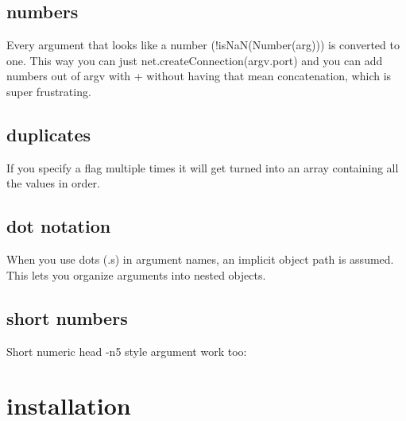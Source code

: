 \subsection*{numbers }

Every argument that looks like a number ({\ttfamily !is\+Na\+N(Number(arg))}) is converted to one. This way you can just {\ttfamily net.\+create\+Connection(argv.\+port)} and you can add numbers out of {\ttfamily argv} with {\ttfamily +} without having that mean concatenation, which is super frustrating.

\subsection*{duplicates }

If you specify a flag multiple times it will get turned into an array containing all the values in order. 


\subsection*{dot notation }

When you use dots ({\ttfamily .}s) in argument names, an implicit object path is assumed. This lets you organize arguments into nested objects. 


\subsection*{short numbers }

Short numeric {\ttfamily head -\/n5} style argument work too\+: 


\section*{installation }

